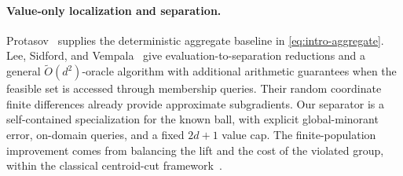 \documentclass[11pt]{article}
\numberwithin{equation}{section}
\theoremstyle{remark}
\theoremstyle{definition}
\begin{document}
\paragraph{Value-only localization and separation.}
Protasov~\cite{protasov1996} supplies the deterministic aggregate
baseline in \eqref{eq:intro-aggregate}. Lee, Sidford, and
Vempala~\cite{lsv2018} give evaluation-to-separation reductions and a
general $\widetilde O(d^2)$-oracle algorithm with additional arithmetic
guarantees when the feasible set is accessed through membership queries.
Their random coordinate finite differences already provide approximate
subgradients. Our separator is a self-contained specialization for the
known ball, with explicit global-minorant error, on-domain queries,
and a fixed $2d+1$ value cap. The finite-population improvement comes from
balancing the lift and the cost of the violated group, within the
classical centroid-cut framework~\cite{bubeck2015}.
\end{document}

